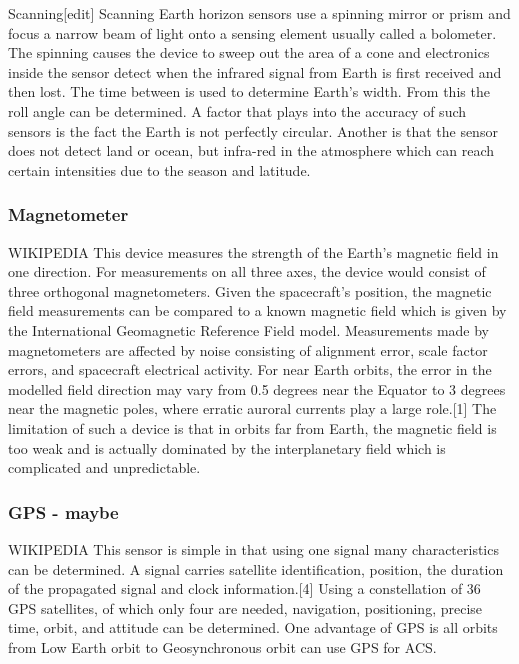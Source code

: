 \documentclass[12pt,a4paper,oneside]{article}
\begin{document}
Scanning[edit]
Scanning Earth horizon sensors use a spinning mirror or prism and focus a narrow beam of light onto a sensing element usually called a bolometer. The spinning causes the device to sweep out the area of a cone and electronics inside the sensor detect when the infrared signal from Earth is first received and then lost. The time between is used to determine Earth’s width. From this the roll angle can be determined. A factor that plays into the accuracy of such sensors is the fact the Earth is not perfectly circular. Another is that the sensor does not detect land or ocean, but infra-red in the atmosphere which can reach certain intensities due to the season and latitude.


\subsubsection{Magnetometer}
WIKIPEDIA
This device measures the strength of the Earth's magnetic field in one direction. For measurements on all three axes, the device would consist of three orthogonal magnetometers. Given the spacecraft's position, the magnetic field measurements can be compared to a known magnetic field which is given by the International Geomagnetic Reference Field model. Measurements made by magnetometers are affected by noise consisting of alignment error, scale factor errors, and spacecraft electrical activity. For near Earth orbits, the error in the modelled field direction may vary from 0.5 degrees near the Equator to 3 degrees near the magnetic poles, where erratic auroral currents play a large role.[1] The limitation of such a device is that in orbits far from Earth, the magnetic field is too weak and is actually dominated by the interplanetary field which is complicated and unpredictable.
\subsubsection{GPS - maybe}
WIKIPEDIA
This sensor is simple in that using one signal many characteristics can be determined. A signal carries satellite identification, position, the duration of the propagated signal and clock information.[4] Using a constellation of 36 GPS satellites, of which only four are needed, navigation, positioning, precise time, orbit, and attitude can be determined. One advantage of GPS is all orbits from Low Earth orbit to Geosynchronous orbit can use GPS for ACS.
\end{document}
